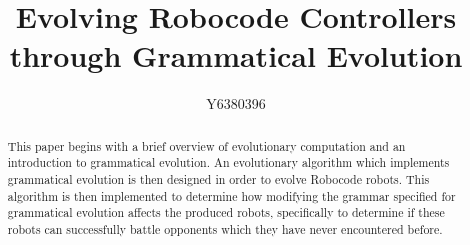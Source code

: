 \documentclass[a4paper, 12pt]{article}
\begin{document}
%
\title{Evolving Robocode Controllers through  Grammatical Evolution}

\author{Y6380396}


% 








\maketitle


\begin{abstract}
This paper begins with a brief overview of evolutionary computation and an introduction to grammatical evolution. An evolutionary algorithm which implements grammatical evolution is then designed in order to evolve Robocode robots. This algorithm is then implemented to determine how modifying the grammar specified for grammatical evolution affects the produced robots, specifically to determine if these robots can successfully battle opponents which they have never encountered before.
\end{abstract}
\end{document}
